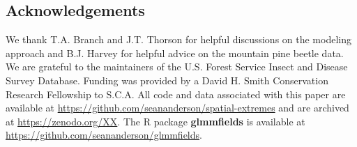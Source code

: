 \documentclass[12pt,english]{article}
\begin{document}
\begin{spacing}{1.9}
%
%

\section{Acknowledgements}

We thank T.A. Branch and J.T. Thorson for helpful discussions on the modeling
approach and B.J. Harvey for helpful advice on the mountain pine beetle data. We
are grateful to the maintainers of the U.S. Forest Service Insect and Disease
Survey Database. Funding was provided by a David H. Smith Conservation Research
Fellowship to S.C.A.
All code and data associated with this paper are available at
\url{https://github.com/seananderson/spatial-extremes} and are archived at
\url{https://zenodo.org/XX}.
The R package \textbf{glmmfields} is available at
\url{https://github.com/seananderson/glmmfields}.


\end{spacing}
\end{document}
